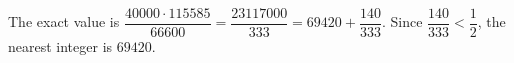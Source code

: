 The exact value is $\dfrac{40000\cdot115585}{66600}=\dfrac{23117000}{333}=69420+\dfrac{140}{333}$. Since $\dfrac{140}{333}<\dfrac{1}{2}$, the nearest integer is $\boxed{69420}$.
